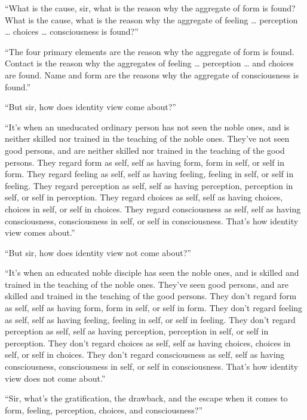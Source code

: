 \documentclass[12pt,openany]{book}%
\begin{document}
“What is the cause, sir, what is the reason why the aggregate of form is found? What is the cause, what is the reason why the aggregate of feeling … perception … choices … consciousness is found?” 

“The four primary elements are the reason why the aggregate of form is found. Contact is the reason why the aggregates of feeling … perception … and choices are found. Name and form are the reasons why the aggregate of consciousness is found.” 

“But sir, how does identity view come about?” 

“It’s when an uneducated ordinary person has not seen the noble ones, and is neither skilled nor trained in the teaching of the noble ones. They’ve not seen good persons, and are neither skilled nor trained in the teaching of the good persons. They regard form as self, self as having form, form in self, or self in form. They regard feeling as self, self as having feeling, feeling in self, or self in feeling. They regard perception as self, self as having perception, perception in self, or self in perception. They regard choices as self, self as having choices, choices in self, or self in choices. They regard consciousness as self, self as having consciousness, consciousness in self, or self in consciousness. That’s how identity view comes about.” 

“But sir, how does identity view not come about?” 

“It’s when an educated noble disciple has seen the noble ones, and is skilled and trained in the teaching of the noble ones. They’ve seen good persons, and are skilled and trained in the teaching of the good persons. They don’t regard form as self, self as having form, form in self, or self in form. They don’t regard feeling as self, self as having feeling, feeling in self, or self in feeling. They don’t regard perception as self, self as having perception, perception in self, or self in perception. They don’t regard choices as self, self as having choices, choices in self, or self in choices. They don’t regard consciousness as self, self as having consciousness, consciousness in self, or self in consciousness. That’s how identity view does not come about.” 

“Sir, what’s the gratification, the drawback, and the escape when it comes to form, feeling, perception, choices, and consciousness?” 
\end{document}
